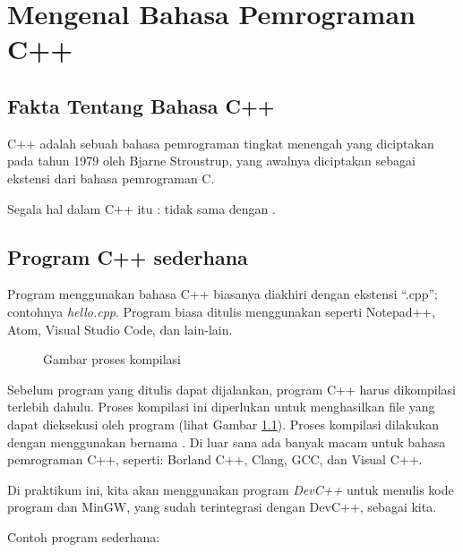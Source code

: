 \documentclass[../main.tex]{subfiles}
\begin{document}
\chapter{Mengenal Bahasa Pemrograman C++}
\section{Fakta Tentang Bahasa C++}
C++ adalah sebuah bahasa pemrograman tingkat menengah yang diciptakan pada tahun
1979 oleh Bjarne Stroustrup, yang awalnya diciptakan sebagai ekstensi dari
bahasa pemrograman C.

Segala hal dalam C++ itu :  tidak sama
dengan .

\section{Program C++ sederhana}
Program menggunakan bahasa C++ biasanya diakhiri dengan ekstensi \enquote{.cpp};
contohnya \emph{hello.cpp}. Program biasa ditulis menggunakan  seperti Notepad++, Atom, Visual Studio Code, dan lain-lain.

\begin{figure}
  \centering
  \caption{Gambar proses kompilasi}
  \label{comp-proc}
\end{figure}

Sebelum program yang ditulis dapat dijalankan, program C++ harus dikompilasi
terlebih dahulu. Proses kompilasi ini diperlukan untuk menghasilkan file yang
dapat dieksekusi oleh program (lihat Gambar \ref{comp-proc}). Proses kompilasi dilakukan
dengan menggunakan  bernama . Di luar sana ada banyak
macam  untuk bahasa pemrograman C++, seperti: Borland C++, Clang,
GCC, dan Visual C++. 

Di praktikum ini, kita akan menggunakan program \emph{DevC++} untuk menulis kode
program dan MinGW, yang sudah terintegrasi dengan DevC++, sebagai 
kita.

Contoh program sederhana:
\end{document}
